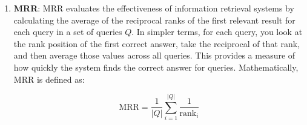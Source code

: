 \begin{enumerate}
    \item 
    \textbf{\ac{MRR}}: \ac{MRR} evaluates the effectiveness of information retrieval systems by calculating the average of the reciprocal ranks of the first relevant result for each query in a set of queries \( Q \). In simpler terms, for each query, you look at the rank position of the first correct answer, take the reciprocal of that rank, and then average those values across all queries. This provides a measure of how quickly the system finds the correct answer for queries. Mathematically, \ac{MRR} is defined as:
    
    \begin{equation}
    \label{eq:mrr}
    \text{MRR} = \frac{1}{|Q|} \sum_{i=1}^{|Q|} \frac{1}{\text{rank}_i}
    \end{equation}
    

\end{enumerate}
